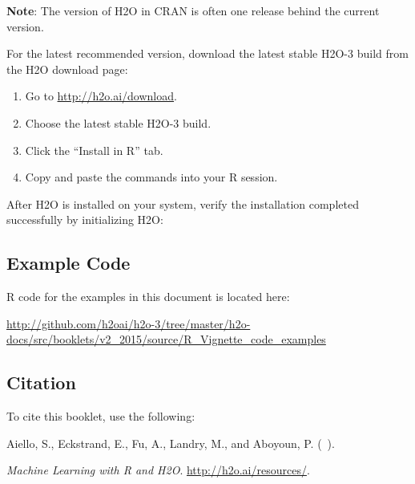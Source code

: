 {{\bf{Note}}: The version of H2O in CRAN is often one release behind the current version.

For the latest recommended version, download the
latest stable H2O-3 build from the H2O download page:

\begin{enumerate}
\item Go to {\url{http://h2o.ai/download}}.
\item Choose the latest stable H2O-3 build.
\item Click the ``Install in R'' tab.
\item Copy and paste the commands into your R session.
\end{enumerate}


After H2O is installed on your system, verify the installation completed successfully by initializing H2O:

\waterExampleInR
\medskip


\subsection{Example Code}

R code for the examples in this document is located here:

\url{http://github.com/h2oai/h2o-3/tree/master/h2o-docs/src/booklets/v2_2015/source/R_Vignette_code_examples}

\subsection{Citation}

To cite this booklet, use the following:

Aiello, S., Eckstrand, E., Fu, A., Landry, M., and Aboyoun, P. (\shortmonthname\ \the\year). {\textit{Machine Learning with R and H2O}. {\url{http://h2o.ai/resources/}}.



}}
